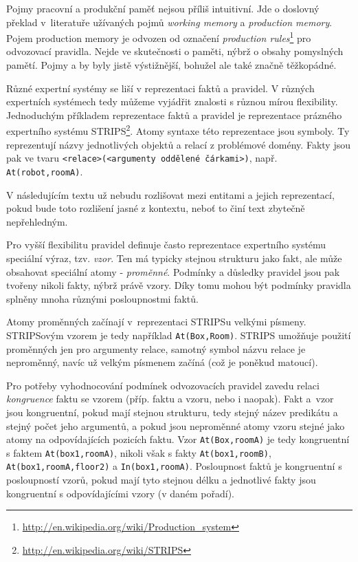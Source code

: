 Pojmy pracovní a produkční paměť nejsou příliš intuitivní. Jde o doslovný
překlad v~literatuře užívaných pojmů \emph{working memory} a \emph{production
memory}. Pojem production memory je odvozen od označení \emph{production
rules}\footnote{\url{http://en.wikipedia.org/wiki/Production\_system}} pro
odvozovací pravidla. Nejde ve skutečnosti o paměti, nýbrž o obsahy pomyslných
pamětí. Pojmy  a  by
byly jistě výstižnější, bohužel ale také značně těžkopádné.

Různé expertní systémy se liší v reprezentaci faktů a pravidel. V různých
expertních systémech tedy můžeme vyjádřit znalosti s různou mírou flexibility.
Jednoduchým příkladem reprezentace faktů a pravidel je reprezentace prázného
expertního systému STRIPS\footnote{\url{http://en.wikipedia.org/wiki/STRIPS}}.
Atomy syntaxe této reprezentace jsou symboly. Ty reprezentují názvy jednotlivých
objektů a relací z problémové domény. Fakty jsou pak ve tvaru
\verb|<relace>(<argumenty oddělené čárkami>)|, např. \verb|At(robot,roomA)|.

V následujícím textu už nebudu rozlišovat mezi entitami a jejich reprezentací,
pokud bude toto rozlišení jasné z kontextu, neboť to činí text zbytečně
nepřehledným.

Pro vyšší flexibilitu pravidel definuje často reprezentace expertního systému
speciální výraz, tzv. \emph{vzor}. Ten má typicky stejnou strukturu jako fakt,
ale může obsahovat speciální atomy - \emph{proměnné}. Podmínky a důsledky
pravidel jsou pak tvořeny nikoli fakty, nýbrž právě vzory. Díky tomu mohou být
podmínky pravidla splněny mnoha různými posloupnostmi faktů.

Atomy proměnných začínají v~reprezentaci STRIPSu velkými písmeny. STRIPSovým
vzorem je tedy například \verb|At(Box,Room)|. STRIPS umožňuje použití proměnných
jen pro argumenty relace, samotný symbol názvu relace je neproměnný, navíc už
velkým písmenem začíná (což je poněkud matoucí).

Pro potřeby vyhodnocování podmínek odvozovacích pravidel zavedu relaci
\emph{kongruence} faktu se vzorem (příp. faktu a vzoru, nebo i naopak). Fakt
a~vzor jsou kongruentní, pokud mají stejnou strukturu, tedy stejný název
predikátu a stejný počet jeho argumentů, a pokud jsou neproměnné atomy vzoru
stejné jako atomy na odpovídajících pozicích faktu. Vzor \verb|At(Box,roomA)|
je tedy kongruentní s faktem \verb|At(box1,roomA)|, nikoli však s fakty
\verb|At(box1,roomB)|, \verb|At(box1,roomA,floor2)| a \verb|In(box1,roomA)|.
Posloupnost faktů je kongruentní s posloupností vzorů, pokud mají tyto stejnou
délku a jednotlivé fakty jsou kongruentní s odpovídajícími vzory (v daném
pořadí).

